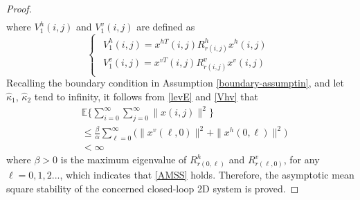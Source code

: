\documentclass[journal,final,twocolumn]{IEEEtran}
\begin{document}
\begin{proof}
\begin{equation}
\begin{split}
		\end{split}
	\end{equation} 
	where $V_{1}^{h}(i,j)$ and $V_{1}^{v}(i,j)$ are defined as   
	\begin{equation*}
	\left\{
	\begin{array}{lr}
	\begin{split}
	V^{h}_{1}(i,j)=x^{hT}(i,j)R^{h}_{r(i,j)}x^{h}(i,j)\\
	V^{v}_{1}(i,j)=x^{vT}(i,j)R^{v}_{r(i,j)}x^{v}(i,j)
	\end{split}
	\end{array}
	\right.
	\end{equation*}
	Recalling the boundary condition in Assumption \ref{boundary-assumptin}, and let $\hat{\kappa}_{1}$, $\hat{\kappa}_{2}$ tend to infinity, it follows from \eqref{levE} and \eqref{Vhv} that
	\begin{equation}
		\begin{split}
		&\mathbb{E}\Big\{\sum_{i=0}^{\infty}\sum_{j=0}^{\infty}  \|x(i,j)\|^{2} \Big\} \\
		&\leq \frac{\beta}{\alpha} \sum_{\ell=0}^{\infty} \big(  \|x^{v}(\ell,0)\|^{2} + \|x^{h}(0,\ell)\|^{2} \big)\\
		&<\infty
		\end{split}	
	\end{equation}
	where $\beta>0$  is the maximum eigenvalue of $R^{h}_{r(0,\ell)}$ and $R^{v}_{r(\ell,0)}$, for any $\ell=0,1,2...$, which indicates that \eqref{AMSS} holds. Therefore, the asymptotic mean square stability of the concerned closed-loop  2D system is proved. 
	

\end{proof}
\end{document}
